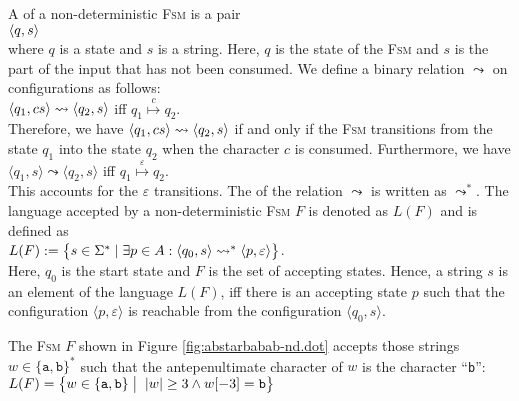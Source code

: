 A  of a non-deterministic \textsc{Fsm} 
is a pair
\\[0.2cm]
\hspace*{1.3cm}
$\pair(q, s)$
\\[0.2cm]
where  $q$ is a state and $s$ is a  string.  Here, $q$ is the state of
the \textsc{Fsm} and $s$ is the part of the input that has not been
consumed.  We define a binary relation
$\leadsto$ \index{$\leadsto$} on configurations as follows:
\\[0.2cm]
\hspace*{1.3cm}
$\pair(q_1, cs) \leadsto \pair(q_2, s)$ \quad iff \quad $q_1 \stackrel{c}{\mapsto} q_2$.
\\[0.2cm]
Therefore, we have $\pair(q_1,cs) \leadsto \pair(q_2, s)$ if and only
if the \textsc{Fsm} transitions from the state
$q_1$ into the state $q_2$ when the character $c$ is consumed.
Furthermore, we have
\\[0.2cm]
\hspace*{1.3cm}
$\langle q_1, s \rangle \leadsto \langle q_2, s \rangle$ \quad iff \quad $q_1 \stackrel{\varepsilon}{\mapsto} q_2$.
\\[0.2cm]
This accounts for the $\varepsilon$ transitions.  The
 of the relation $\leadsto$ is written as $\leadsto^*$.
The language accepted by a non-deterministic \textsc{Fsm} $F$ is
denoted as $L(F)$ and is defined as
\\[0.2cm]
\hspace*{1.3cm}
$L(F) := \bigl\{ s \in \Sigma^* \mid  
                 \exists p \in A : \pair(q_0,s) \leadsto^* \pair(p,\varepsilon) \bigr\}$.
\\[0.2cm]
Here,  $q_0$ is the  start state and $F$ is the set of accepting
states.  Hence, a string  $s$ is an element of the language  $L(F)$,  
iff there is an accepting state $p$ such that the configuration $\langle p, \varepsilon \rangle$ is reachable from the configuration $\langle q_0, s \rangle$.

\exampleEng 
The \textsc{Fsm} $F$ shown in Figure \ref{fig:abstarbabab-nd.dot} accepts
those strings $w \in \{ \mathtt{a}, \mathtt{b} \}^*$ such that the
antepenultimate character of $w$ is  the character ``\texttt{b}'':
\\[0.2cm]
\hspace*{1.3cm}
$L(F) = \bigl\{ w \in \{ \mathtt{a}, \mathtt{b} \} \bigm|\; |w| \geq 3 \wedge w[-3] = \mathtt{b} \bigr\}$
 \eox
\vspace*{0.3cm}

